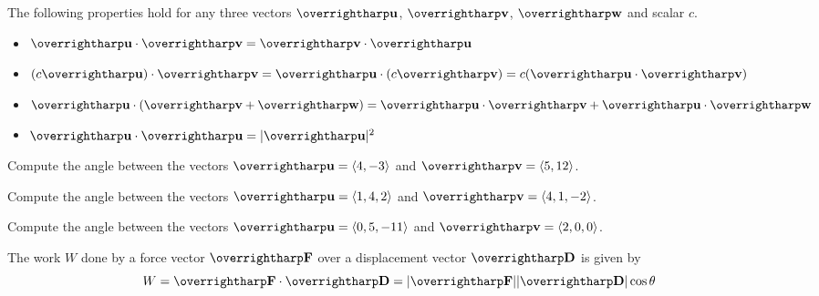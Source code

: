 \documentclass[letterpaper, twoside, 12pt]{book}
\begin{document}
\begin{theorem}
The following properties hold for any three vectors $\harpvec{u}$, $\harpvec{v}$,
$\harpvec{w}$ and scalar $c$.
  \begin{itemize}
  \item $\harpvec{u} \cdot \harpvec{v} = \harpvec{v}\cdot\harpvec{u}$
  \item $(c\harpvec{u})\cdot \harpvec{v} = \harpvec{u} \cdot (c\harpvec{v}) = c(\harpvec{u} \cdot \harpvec{v})$
  \item $\harpvec{u} \cdot (\harpvec{v} + \harpvec{w}) = \harpvec{u}\cdot\harpvec{v} + \harpvec{u}\cdot \harpvec{w}$
  \item $\harpvec{u} \cdot \harpvec{u} = |\harpvec{u}|^2$
  \end{itemize}
\end{theorem}

          \begin{problem}
            Compute the angle between the vectors
            $\harpvec{u}=\<4,-3\>$ and $\harpvec{v}=\<5,12\>$.
          \end{problem}

          \begin{solution}

          \end{solution}

          \begin{problem}
            Compute the angle between the vectors
            $\harpvec{u}=\<1,4,2\>$ and $\harpvec{v}=\<4,1,-2\>$.
          \end{problem}

          \begin{solution}

          \end{solution}

          \begin{problem}
            Compute the angle between the vectors
            $\harpvec{u}=\<0,5,-11\>$ and $\harpvec{v}=\<2,0,0\>$.
          \end{problem}

          \begin{solution}

          \end{solution}



\begin{definition}
The work $W$ done by a force vector $\harpvec{F}$ over a displacement
vector $\harpvec{D}$ is given by
\[
  W = \harpvec{F} \cdot \harpvec{D}
    =
  |\harpvec{F}||\harpvec{D}|\cos \theta
\]
\end{definition}
\end{document}
